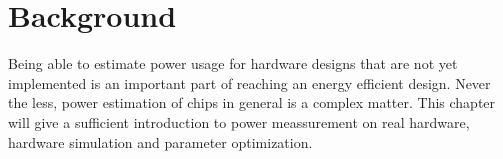 \chapter{Background}
Being able to estimate power usage for hardware designs that are not yet
implemented is an important part of reaching an energy efficient design. Never
the less, power estimation of chips in general is a complex matter. This chapter
will give a sufficient introduction to power meassurement on real hardware,
hardware simulation and parameter optimization.






